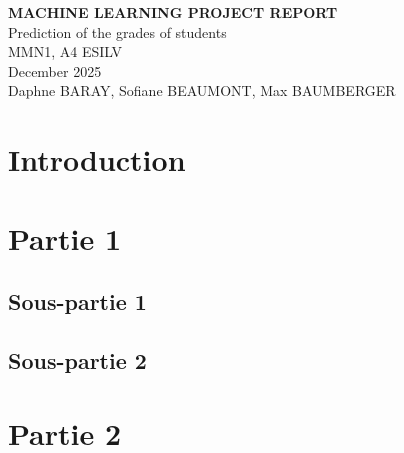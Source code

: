 \documentclass{article}
\begin{document}
\begin{titlepage}
    \centering
    \vspace*{2cm}
    {\Huge \textbf{MACHINE LEARNING PROJECT REPORT}} \\
    \vspace{1cm}
    {\Large Prediction of the grades of students} \\
    \vfill
    {\Large MMN1, A4 ESILV} \\
    {\Large December 2025} \\
    \vspace{0.5cm}
    {\Large Daphne BARAY, Sofiane BEAUMONT, Max BAUMBERGER} \\
    \vfill
\end{titlepage}

\clearpage
\pagestyle{fancy}

\setcounter{page}{2}
\tableofcontents
\thispagestyle{fancy} %
\clearpage

\section*{Introduction}
\label{sec:intro}
\setcounter{page}{3}
\clearpage

\section*{Partie 1}
\label{sec:partie1}
\setcounter{page}{4}
\subsection*{Sous-partie 1}
\label{sec:partie1_s1}
\subsection*{Sous-partie 2}
\label{sec:partie1_s2}
\clearpage

\section*{Partie 2}
\label{sec:partie2}
\setcounter{page}{5}
\end{document}
